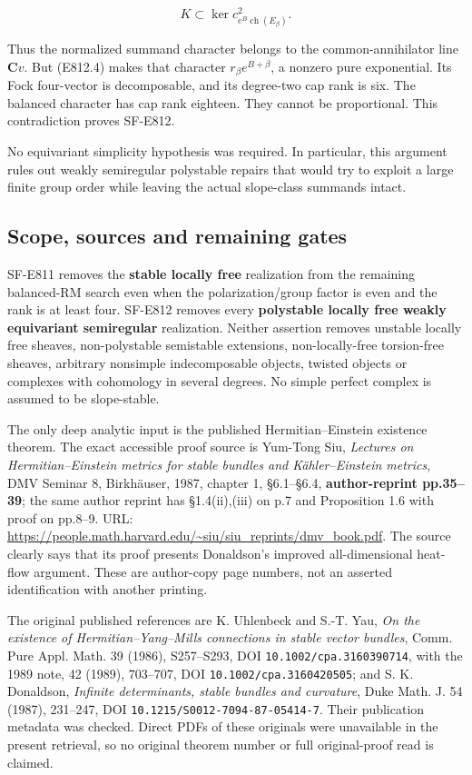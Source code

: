 \[
 K\subset\ker c^2_{e^B\operatorname{ch}(E_\beta)}.
\]

Thus the normalized summand character belongs to the common-annihilator
line \(\mathbf C v\). But (E812.4) makes that character
\(r_\beta e^{B+\beta}\), a nonzero pure exponential. Its Fock
four-vector is decomposable, and its degree-two cap rank is six. The
balanced character has cap rank eighteen. They cannot be proportional.
This contradiction proves SF-E812.

No equivariant simplicity hypothesis was required. In particular, this
argument rules out weakly semiregular polystable repairs that would try
to exploit a large finite group order while leaving the actual
slope-class summands intact.

\subsection{Scope, sources and remaining
gates}\label{scope-sources-and-remaining-gates}

SF-E811 removes the \textbf{stable locally free} realization from the
remaining balanced-RM search even when the polarization/group factor is
even and the rank is at least four. SF-E812 removes every
\textbf{polystable locally free weakly equivariant semiregular}
realization. Neither assertion removes unstable locally free sheaves,
non-polystable semistable extensions, non-locally-free torsion-free
sheaves, arbitrary nonsimple indecomposable objects, twisted objects or
complexes with cohomology in several degrees. No simple perfect complex
is assumed to be slope-stable.

The only deep analytic input is the published Hermitian--Einstein
existence theorem. The exact accessible proof source is Yum-Tong Siu,
\emph{Lectures on Hermitian--Einstein metrics for stable bundles and
Kähler--Einstein metrics}, DMV Seminar 8, Birkhäuser, 1987, chapter 1,
§6.1--§6.4, \textbf{author-reprint pp.35--39}; the same author reprint
has §1.4(ii),(iii) on p.7 and Proposition 1.6 with proof on pp.8--9.
URL:
\url{https://people.math.harvard.edu/~siu/siu_reprints/dmv_book.pdf}.
The source clearly says that its proof presents Donaldson's improved
all-dimensional heat-flow argument. These are author-copy page numbers,
not an asserted identification with another printing.

The original published references are K. Uhlenbeck and S.-T. Yau,
\emph{On the existence of Hermitian--Yang--Mills connections in stable
vector bundles}, Comm. Pure Appl. Math. 39 (1986), S257--S293, DOI
\texttt{10.1002/cpa.3160390714}, with the 1989 note, 42 (1989),
703--707, DOI \texttt{10.1002/cpa.3160420505}; and S. K. Donaldson,
\emph{Infinite determinants, stable bundles and curvature}, Duke Math.
J. 54 (1987), 231--247, DOI \texttt{10.1215/S0012-7094-87-05414-7}.
Their publication metadata was checked. Direct PDFs of these originals
were unavailable in the present retrieval, so no original theorem number
or full original-proof read is claimed.

